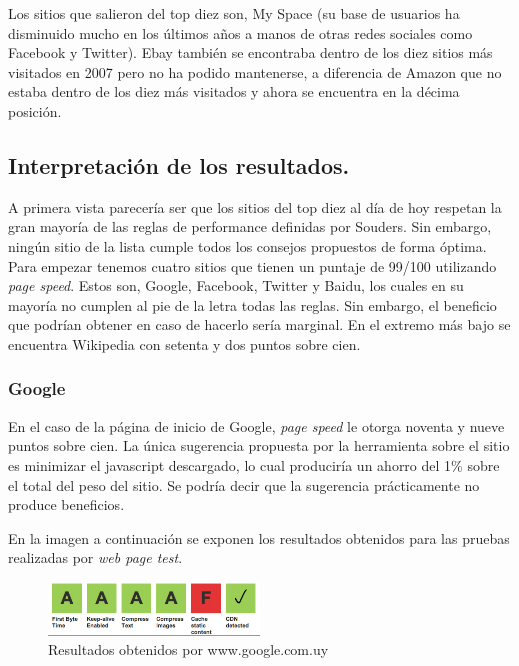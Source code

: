 Los sitios que salieron del top diez son, My Space (su base de usuarios ha disminuido mucho en los últimos años a manos de otras redes sociales
como Facebook y Twitter). Ebay también se encontraba dentro de los diez sitios más visitados en 2007 pero no ha podido mantenerse, a diferencia de Amazon que no estaba
dentro de los diez más visitados y ahora se encuentra en la décima posición.

\subsection{Interpretación de los resultados.}

A primera vista parecería ser que los sitios del top diez al día de hoy respetan la gran mayoría de las reglas de performance definidas por Souders. Sin embargo, ningún sitio
de la lista cumple todos los consejos propuestos de forma óptima. Para empezar tenemos cuatro sitios que tienen un puntaje de 99/100 utilizando \emph{page
speed}. Estos son, Google, Facebook, Twitter y Baidu, los cuales en su mayoría no cumplen al pie de la letra todas las reglas. Sin embargo, el beneficio que podrían obtener en caso de hacerlo sería marginal. En el extremo más bajo se encuentra Wikipedia con setenta y dos puntos sobre cien.

\subsubsection{Google}

En el caso de la página de inicio de Google, \emph{page speed} le otorga noventa y nueve puntos sobre cien. La única sugerencia propuesta por la herramienta sobre el sitio es minimizar el javascript descargado, lo cual produciría un ahorro del 1\% sobre el total del peso del sitio. Se podría decir que la sugerencia prácticamente
no produce beneficios.

En la imagen a continuación se exponen los resultados obtenidos para las pruebas realizadas por \emph{web page test}.

\begin{figure}[h]
\centering
\includegraphics[width=0.5\textwidth]{figuras/lado_cliente/google/page_results.png}
  \caption{Resultados obtenidos por www.google.com.uy}
    \label{fig.google_page_results}
\end{figure}

